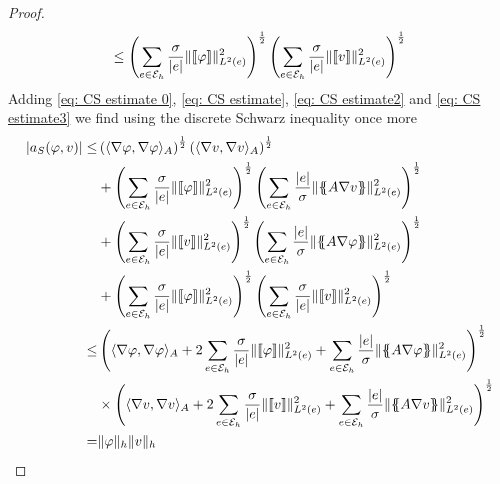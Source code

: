 \begin{proof}
\begin{align}
\leq \left( \sum\limits_{e \in \mathcal{E}_h} \frac \sigma{|e|} \lVert \llbracket \varphi \rrbracket \rVert_{L^2(e)}^2 \right)^{\frac 1 2} \left( \sum\limits_{e \in \mathcal{E}_h} \frac \sigma {|e|} \lVert \llbracket v \rrbracket \rVert_{L^2(e)}^2 \right)^{\frac 1 2} \label{eq: CS estimate3}
\end{align}
Adding \eqref{eq: CS estimate 0}, \eqref{eq: CS estimate}, \eqref{eq: CS estimate2} and \eqref{eq: CS estimate3} we find using the discrete Schwarz inequality once more
\begin{align}
	|a_S(\varphi,v)| \leq& 
		\left( {\bilinA {\nabla \varphi} {\nabla \varphi}}\right)^{\frac 1 2 } \left( {\bilinA {\nabla v}{\nabla v}}\right)^{\frac 1 2 } \nonumber\\
	& +\left( \sum\limits_{e \in \edges}\frac {\sigma}{|e|}\LTwonormE{\jump {\varphi}}^2 \right)^{\frac 1 2}
			\left( \sum\limits_{e \in \edges} \frac {|e|} \sigma \LTwonormE{\average{A \nabla v}}^2 \right)^{\frac 1 2} \nonumber\\
	& +	\left( \sum\limits_{e \in \edges} \frac {\sigma} {|e|}\LTwonormE{\jump {v}}^2 \right)^{\frac 1 2}
				\left( \sum\limits_{e \in \edges} \frac {|e|} \sigma \LTwonormE{\average{A \nabla \varphi}}^2 \right)^{\frac 1 2}\nonumber \\
	& + \left( \sum\limits_{e \in \edges} \frac \sigma{|e|} \LTwonormE{\jump{\varphi}}^2 \right)^{\frac 1 2} \left( \sum\limits_{e \in \edges} \frac \sigma {|e|} \LTwonormE{\jump{v}}^2 \right)^{\frac 1 2} \nonumber \\
	\leq& 
	\left( 
		\bilinA {\nabla \varphi} {\nabla \varphi}+2\sum\limits_{e \in \edges} \frac {\sigma} {|e|}\LTwonormE{\jump {\varphi}}^2+ \sum\limits_{e \in \edges} \frac {|e|} \sigma \LTwonormE{\average{A \nabla \varphi}}^2
	\right)^{\frac 1 2} \nonumber \\
	&\times
		\left( 
			\bilinA {\nabla v} {\nabla v}+2\sum\limits_{e \in \edges} \frac {\sigma}{|e|}\LTwonormE{\jump {v}}^2+ \sum\limits_{e \in \edges} \frac {|e|} \sigma \LTwonormE{\average{A \nabla v}}^2
		\right) ^{\frac 1 2} \\
		= & \eNorm \varphi \eNorm v 
\end{align}
\end{proof}


